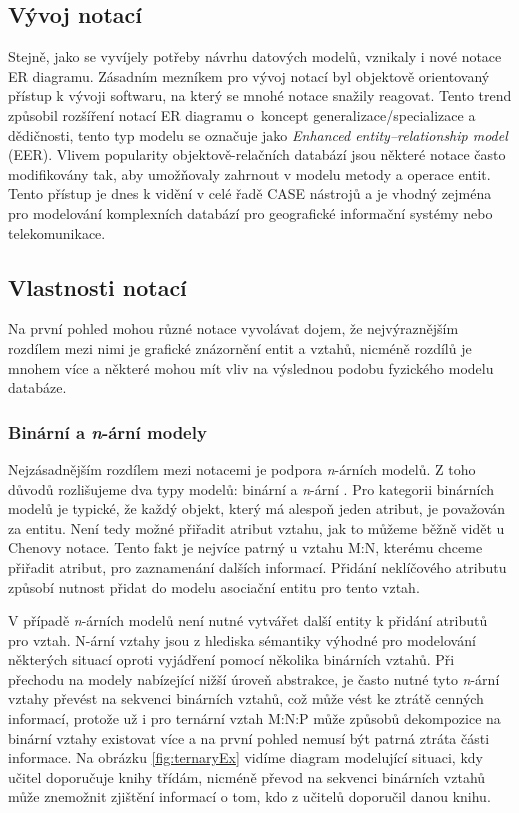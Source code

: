 \documentclass[czech,bachelor,public,dept460,male,oneside]{diploma}
\begin{document}
	\subsection{Vývoj notací}
	Stejně, jako se vyvíjely potřeby návrhu datových modelů, vznikaly i nové notace ER diagramu. Zásadním mezníkem pro vývoj notací byl objektově orientovaný přístup k vývoji softwaru, na který se mnohé notace snažily reagovat. Tento trend způsobil rozšíření notací ER diagramu o~koncept generalizace/specializace a dědičnosti, tento typ modelu se označuje jako \emph{Enhanced entity–relationship model} (EER). Vlivem popularity objektově-relačních databází jsou některé notace často modifikovány tak, aby umožňovaly zahrnout v modelu metody a operace entit. Tento přístup je dnes k vidění v celé řadě CASE nástrojů a je vhodný zejména pro modelování komplexních databází pro geografické informační systémy nebo telekomunikace.
	
	\subsection{Vlastnosti notací}
	Na první pohled mohou různé notace vyvolávat dojem, že nejvýraznějším rozdílem mezi nimi je grafické znázornění entit a vztahů, nicméně rozdílů je mnohem více a některé mohou mít vliv na výslednou podobu fyzického modelu databáze.
		
		\subsubsection{Binární a \textit{n}-ární modely}
		Nejzásadnějším rozdílem mezi notacemi je podpora \textit{n}-árních modelů. Z toho důvodů rozlišujeme dva typy modelů: binární a \textit{n}-ární \cite{compErNotations}. Pro kategorii binárních modelů je typické, že každý objekt, který má alespoň jeden atribut, je považován za entitu. Není tedy možné přiřadit atribut vztahu, jak to můžeme běžně vidět u Chenovy notace. Tento fakt je nejvíce patrný u vztahu M:N, kterému chceme přiřadit atribut, pro zaznamenání dalších informací. Přidání neklíčového atributu způsobí nutnost přidat do modelu asociační entitu pro tento vztah. 
		
		V případě \textit{n}-árních modelů není nutné vytvářet další entity k přidání atributů pro vztah. N-ární vztahy jsou z hlediska sémantiky výhodné pro modelování některých situací oproti vyjádření pomocí několika binárních vztahů. Při přechodu na modely nabízející nižší úroveň abstrakce, je často nutné tyto \textit{n}-ární vztahy převést na sekvenci binárních vztahů, což může vést ke ztrátě cenných informací, protože už i pro ternární vztah M:N:P může způsobů dekompozice na binární vztahy existovat více a na první pohled nemusí být patrná ztráta části informace. Na obrázku \ref{fig:ternaryEx} vidíme diagram modelující situaci, kdy učitel doporučuje knihy třídám, nicméně převod na sekvenci binárních vztahů může znemožnit zjištění informací o tom, kdo z učitelů doporučil danou knihu.
		
\end{document}
